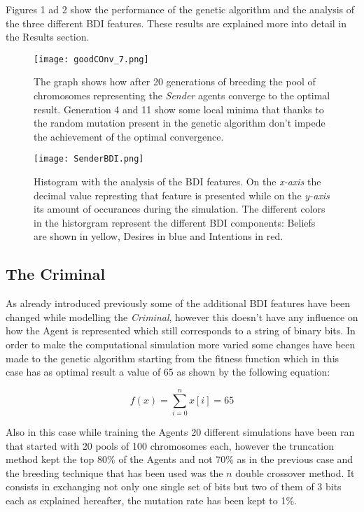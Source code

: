 \documentclass[a4paper]{article}
\begin{document}
Figures 1 ad 2 show the performance of the genetic algorithm and the analysis of the three different BDI features. These results are explained more into detail in the Results section.

\begin{figure}[ht!]
   \texttt{[image: goodCOnv\_7.png]}
  \caption{The graph shows how after 20 generations of breeding the pool of chromosomes representing the \textit{Sender} agents converge to the optimal result. Generation 4 and 11 show some local minima that thanks to the random mutation present in the genetic algorithm don't impede the achievement of the optimal convergence.}\label{fig:awesome_image3}
\endminipage\hfill
{}
  \texttt{[image: SenderBDI.png]}
  \caption{Histogram with the analysis of the BDI features. On the \textit{x-axis} the decimal value represting that feature is presented while on the \textit{y-axis} its amount of occurances during the simulation. The different colors in the historgram represent the different BDI components: Beliefs are shown in yellow, Desires in blue and Intentions in red.}\label{fig:awesome_image4}
\endminipage\hfill
\end{figure}


\subsection{The Criminal}

As already introduced previously some of the additional BDI features have been changed while modelling the \textit{Criminal}, however this doesn't have any influence on how the Agent is represented which still corresponds to a string of binary bits. In order to make the computational simulation more varied some changes have been made to the genetic algorithm starting from the fitness function which in this case has as optimal result a value of 65 as shown by the following equation:

\begin{equation}
	f(x) = \sum\limits_{i=0}^{n} x[i] = 65
\end{equation} 

Also in this case while training the Agents 20 different simulations have been ran that started with 20 pools of 100 chromosomes each, however the truncation method kept the top 80\% of the Agents and not 70\% as in the previous case and the breeding technique that has been used was the $n$ double crossover method. It consists in exchanging not only one single set of bits but two of them of 3 bits each as explained hereafter, the mutation rate has been kept to 1\%.    
\end{document}
